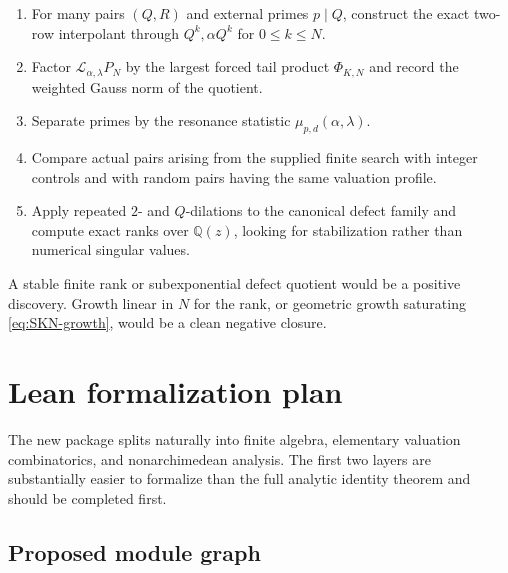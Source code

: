 \documentclass[11pt,oneside]{article}
\theoremstyle{definition}
\newcommand{\Q}{\mathbb Q}
\begin{document}
\begin{enumerate}
\item For many pairs $(Q,R)$ and external primes $p\mid Q$, construct the exact two-row
  interpolant through $Q^k,\alpha Q^k$ for $0\le k\le N$.
\item Factor $\mathcal L_{\alpha,\lambda}P_N$ by the largest forced tail product
  $\Phi_{K,N}$ and record the weighted Gauss norm of the quotient.
\item Separate primes by the resonance statistic $\mu_{p,d}(\alpha,\lambda)$.
\item Compare actual pairs arising from the supplied finite search with integer controls and
  with random pairs having the same valuation profile.
\item Apply repeated $2$- and $Q$-dilations to the canonical defect family and compute exact
  ranks over $\Q(z)$, looking for stabilization rather than numerical singular values.
\end{enumerate}

A stable finite rank or subexponential defect quotient would be a positive discovery.  Growth
linear in $N$ for the rank, or geometric growth saturating \eqref{eq:SKN-growth}, would be a
clean negative closure.

\section{Lean formalization plan}
\label{sec:lean-plan}

The new package splits naturally into finite algebra, elementary valuation combinatorics, and
nonarchimedean analysis.  The first two layers are substantially easier to formalize than the
full analytic identity theorem and should be completed first.

\subsection{Proposed module graph}
\end{document}
